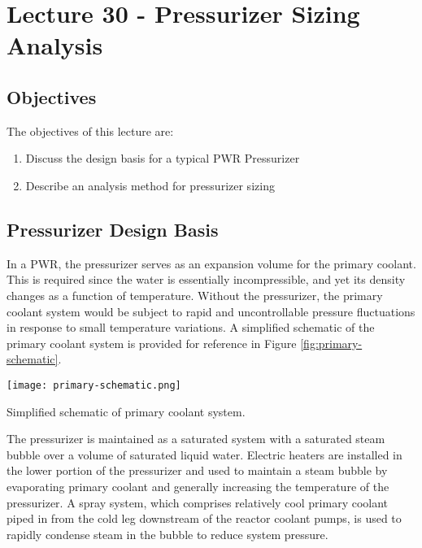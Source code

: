 \chapter{Lecture 30 - Pressurizer Sizing Analysis}
\label{ch:ch30}
\section{Objectives}
The objectives of this lecture are:
\begin{enumerate}
\item Discuss the design basis for a typical PWR Pressurizer
\item Describe an analysis method for pressurizer sizing
\end{enumerate}

\section{Pressurizer Design Basis}
In a PWR, the pressurizer serves as an expansion volume for the primary coolant.  This is required since the water is essentially incompressible, and yet its density changes as a function of temperature.  Without the pressurizer, the primary coolant system would be subject to rapid and uncontrollable pressure fluctuations in response to small temperature variations.  A simplified schematic of the primary coolant system is provided for reference in Figure \ref{fig:primary-schematic}.
\begin{marginfigure}
\texttt{[image: primary-schematic.png]}
\caption{Simplified schematic of primary coolant system.}
\label{fig:primary-schematic}
\end{marginfigure}

The pressurizer is maintained as a saturated system with a saturated steam bubble over a volume of saturated liquid water.  Electric heaters are installed in the lower portion of the pressurizer and used to maintain a steam bubble by evaporating primary coolant and generally increasing the temperature of the pressurizer. A spray system, which comprises relatively cool primary coolant piped in from the cold leg downstream of the reactor coolant pumps, is used to rapidly condense steam in the bubble to reduce system pressure. 

